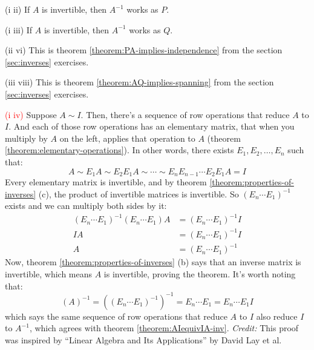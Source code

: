 \documentclass[11pt, letterpaper]{report}
\newenvironment{book}{}{}
\newcounter{exercise}[section]
\newcounter{theorem}[chapter]
\begin{document}
\begin{book}
(i \rightarrow\hspace{1pt} ii) If $A$ is invertible, then $A^{-1}$ works as $P$.

(i \rightarrow\hspace{1pt} iii) If $A$ is invertible, then $A^{-1}$ works as $Q$.

(ii \rightarrow\hspace{1pt} vi) This is theorem \ref{theorem:PA-implies-independence} from the section \ref{sec:inverses} exercises.

(iii \rightarrow\hspace{1pt} viii) This is theorem \ref{theorem:AQ-implies-spanning} from the section \ref{sec:inverses} exercises.

\textcolor{red}{(i \leftarrow \hspace{1pt} iv)} Suppose $A \sim I$. Then, there's a sequence of row operations that reduce $A$ to $I$. And each of those row operations has an elementary matrix, that when you multiply by $A$ on the left, applies that operation to $A$ (theorem \ref{theorem:elementary-operations}). In other words, there exists $E_1,E_2,\ldots,E_n$ such that:
\[ A \sim E_1A \sim E_2E_1A \sim \cdots \sim E_nE_{n-1}\cdots E_2E_1A = I\]
Every elementary matrix is invertible, and by theorem \ref{theorem:properties-of-inverses} (c), the product of invertible matrices is invertible. So $( E_n\cdots E_1 )^{-1}$ exists and we can multiply both sides by it:
\begin{align*}
( E_n\cdots E_1 )^{-1} (  E_n\cdots E_1)A &= ( E_n\cdots E_1 )^{-1}I \\
I A&= ( E_n\cdots E_1 )^{-1}I \\
A &= ( E_n\cdots E_1 )^{-1}
\end{align*}
Now, theorem \ref{theorem:properties-of-inverses} (b) says that an inverse matrix is invertible, which means $A$ is invertible, proving the theorem. It's worth noting that:
\[(A)^{-1} = (( E_n\cdots E_1 )^{-1})^{-1} = E_n\cdots E_1 = E_n\cdots E_1I\]
which says the same sequence of row operations that reduce $A$ to $I$ also reduce $I$ to $A^{-1}$, which agrees with theorem \ref{theorem:AIequivIA-inv}. \emph{Credit:} This proof was inspired by ``Linear Algebra and Its Applications'' by David Lay et al. \blacksquare
\end{book}
\end{document}
